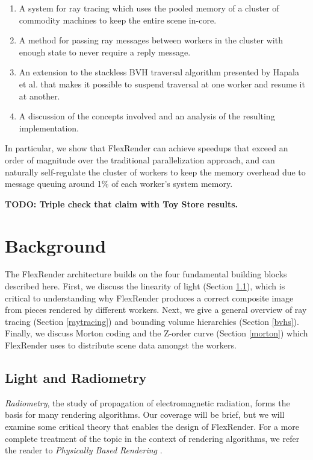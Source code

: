 \documentclass[12pt]{ucthesis}
\begin{document}
\begin{enumerate}
    \item A system for ray tracing which uses the pooled memory of a cluster of
        commodity machines to keep the entire scene in-core.
    \item A method for passing ray messages between workers in the cluster with
        enough state to never require a reply message.
    \item An extension to the stackless BVH traversal algorithm presented by
        Hapala et al. \cite{hapala:2011} that makes it possible to suspend
        traversal at one worker and resume it at another.
    \item A discussion of the concepts involved and an analysis of the resulting
        implementation.
\end{enumerate}

In particular, we show that FlexRender can achieve speedups that exceed an
order of magnitude over the traditional parallelization approach, and can
naturally self-regulate the cluster of workers to keep the memory overhead due
to message queuing around 1\% of each worker's system memory.

\textbf{TODO: Triple check that claim with Toy Store results.}

\chapter{Background}
\label{background}

The FlexRender architecture builds on the four fundamental building blocks
described here. First, we discuss the linearity of light (Section \ref{radiometry}),
which is critical to understanding why FlexRender produces a correct composite
image from pieces rendered by different workers. Next, we give a general
overview of ray tracing (Section \ref{raytracing}) and bounding volume hierarchies
(Section \ref{bvhs}). Finally, we discuss Morton coding and the Z-order curve
(Section \ref{morton}) which FlexRender uses to distribute scene data amongst the
workers.

\section{Light and Radiometry}
\label{radiometry}

\emph{Radiometry}, the study of propagation of electromagnetic radiation, forms
the basis for many rendering algorithms. Our coverage will be brief, but we will
examine some critical theory that enables the design of FlexRender. For a more
complete treatment of the topic in the context of rendering algorithms, we refer
the reader to \emph{Physically Based Rendering} \cite{pbrt}.
\end{document}
